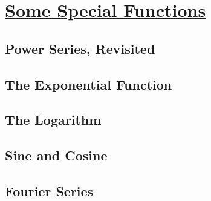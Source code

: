\section[Some Special Functions]{\hyperlink{toc}{Some Special Functions}}

\subsection{Power Series, Revisited}

\subsection{The Exponential Function}

\subsection{The Logarithm}

\subsection{Sine and Cosine}

\subsection{Fourier Series}